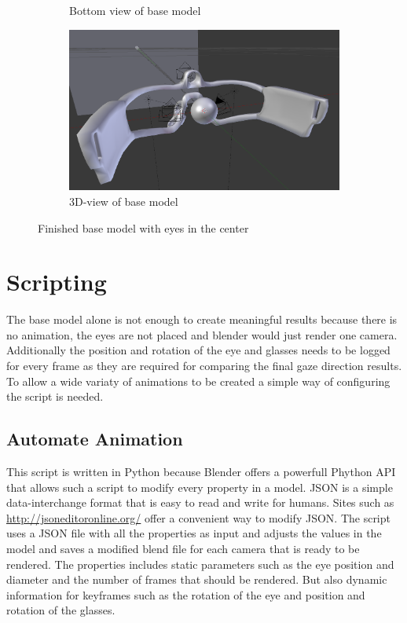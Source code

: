\begin{figure}
\begin{subfigure}{.5\textwidth}
		\caption{Bottom view of base model}
		\label{fig:baseBottom}
	\end{subfigure}
	\begin{subfigure}{.5\textwidth}
		\centering
		\includegraphics[width=0.9\linewidth]{images/base_model_3D.png}
		\caption{3D-view of base model}
		\label{fig:base3D}
	\end{subfigure}
	\caption{Finished base model with eyes in the center}
	\label{fig:baseModel}
\end{figure}
\section{Scripting}
The base model alone is not enough to create meaningful results because there is no animation, the eyes are not placed and blender would just render one camera. Additionally the position and rotation of the eye and glasses needs to be logged for every frame as they are required for comparing the final gaze direction results. To allow a wide variaty of animations to be created a simple way of configuring the script is needed.
\subsection{Automate Animation}
This script is written in Python because Blender offers a powerfull Phython API that allows such a script to modify every property in a model. 
JSON is a simple data-interchange format that is easy to read and write for humans. Sites such as \url{http://jsoneditoronline.org/} offer a convenient way to modify JSON. The script uses a JSON file with all the properties as input and adjusts the values in the model and saves a modified blend file for each camera that is ready to be rendered. The properties includes static parameters such as the eye position and diameter and the number of frames that should be rendered. But also dynamic information for keyframes such as the rotation of the eye and position and rotation of the glasses. 
